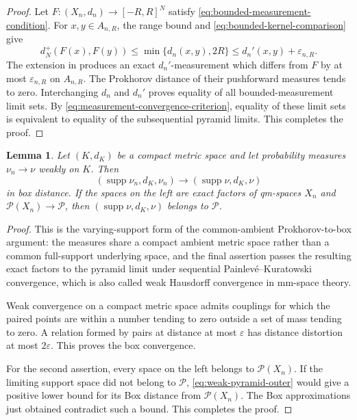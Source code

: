\documentclass[10pt,a4paper]{amsart}
\numberwithin{equation}{section}
\newtheorem{lemma}[theorem]{Lemma}
\newcommand{\Pyr}{\mathcal P}
\DeclareMathOperator{\supp}{supp}
\newcommand{\eps}{\varepsilon}
\begin{document}
\begin{proof}
Let $F\colon(X_n,d_n)\to[-R,R]^N$ satisfy \eqref{eq:bounded-measurement-condition}.  For $x,y\in A_{n,R}$, the range bound and \eqref{eq:bounded-kernel-comparison} give
\[ d_N^+(F(x),F(y)) \le\min\{d_n(x,y),2R\} \le d_n'(x,y)+\eps_{n,R}. \]
The extension in  produces an exact $d_n'$-measurement which differs from $F$ by at most $\eps_{n,R}$ on $A_{n,R}$.  The Prokhorov distance of their pushforward measures tends to zero.  Interchanging $d_n$ and $d_n'$ proves equality of all bounded-measurement limit sets.
By \eqref{eq:measurement-convergence-criterion}, equality of these limit sets is equivalent to equality of the subsequential pyramid limits.
	This completes the proof.
\end{proof}

\begin{lemma}\label{lem:common-ambient-box}
Let $(K,d_K)$ be a compact metric space and let probability measures $\nu_n\longrightarrow\nu$ weakly on $K$.  Then
\[ (\supp\nu_n,d_K,\nu_n) \longrightarrow(\supp\nu,d_K,\nu) \]
in box distance.  If the spaces on the left are exact factors of qm-spaces $X_n$ and $\Pyr(X_n)\to\mathcal P$, then $(\supp\nu,d_K,\nu)$ belongs to $\mathcal P$.
\end{lemma}

\begin{proof}
This is the varying-support form of the common-ambient Prokhorov-to-box argument: the measures share a compact ambient metric space rather than a common full-support underlying space, and the final assertion passes the resulting exact factors to the pyramid limit under sequential Painlev\'e--Kuratowski convergence, which is also called weak Hausdorff convergence in mm-space theory.

Weak convergence on a compact metric space admits couplings for which the paired points are within a number tending to zero outside a set of mass tending to zero.  A relation formed by pairs at distance at most $\eps$ has distance distortion at most $2\eps$.  This proves the box convergence.

For the second assertion, every space on the left belongs to $\Pyr(X_n)$.  If the limiting support space did not belong to $\mathcal P$, \eqref{eq:weak-pyramid-outer} would give a positive lower bound for its Box distance from $\Pyr(X_n)$.  The Box approximations just obtained contradict such a bound.
	This completes the proof.
\end{proof}
\end{document}
